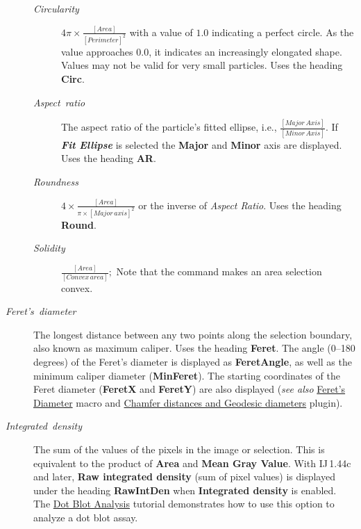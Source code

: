 \begin{description}
\begin{description}
\item [{\emph{Circularity}}] \emph{$\ensuremath{4\pi\times\frac{[Area]}{[Perimeter]^{2}}}$}
with a value of $1.0$ indicating a perfect circle. As the value approaches
$0.0$, it indicates an increasingly elongated shape. Values may not
be valid for very small particles. Uses the heading\textbf{ Circ}.
\item [{\emph{Aspect\ ratio}}] The aspect ratio of the particle's fitted
ellipse, i.e., $\ensuremath{\frac{[Major\, Axis]}{[Minor\, Axis]}}$.
If \textbf{\emph{Fit Ellipse}} is selected the\textbf{ Major} and
\textbf{Minor} axis are displayed. Uses the heading\textbf{ AR}.
\item [{\emph{Roundness}}] $\ensuremath{4\times{}\frac{[Area]}{\pi\times[Major\, axis]^{2}}}$
or the inverse of \emph{Aspect Ratio}. Uses the heading \textbf{Round}.
\item [{\emph{Solidity}}] $\ensuremath{\frac{[Area]}{[Convex\, area]}};$
Note that the 
command makes an area selection convex.
\end{description}
\item [{\emph{Feret's\ diameter}}] The longest distance between any two
points along the selection boundary, also known as maximum
caliper. Uses the heading \textbf{Feret}. The angle (0--180 degrees)
of the Feret's diameter is displayed as \textbf{FeretAngle}, as well
as the minimum caliper diameter (\textbf{MinFeret}). The starting
coordinates of the Feret diameter (\textbf{FeretX} and \textbf{FeretY})
are also displayed (\emph{see also} \href{http://imagej.nih.gov/ij/macros/FeretsDiameter.txt}{Feret's Diameter}
macro and \href{http://imagejdocu.tudor.lu/doku.php?id=plugin:analysis:geodesic_distances:start}{Chamfer distances and Geodesic diameters}
plugin).
\item [{\emph{Integrated\ density}}] The sum of the values of the pixels
in the image or selection. This is equivalent to the product of \textbf{Area}
and \textbf{Mean Gray Value}. With IJ\,1.44c and later, \textbf{Raw
integrated density} (sum of pixel values) is displayed under the heading
\textbf{RawIntDen} when \textbf{Integrated density} is enabled. The
\href{http://imagej.nih.gov/ij/docs/examples/dot-blot/}{Dot Blot Analysis}
tutorial demonstrates how to use this option to analyze a dot blot
assay.

\end{description}
